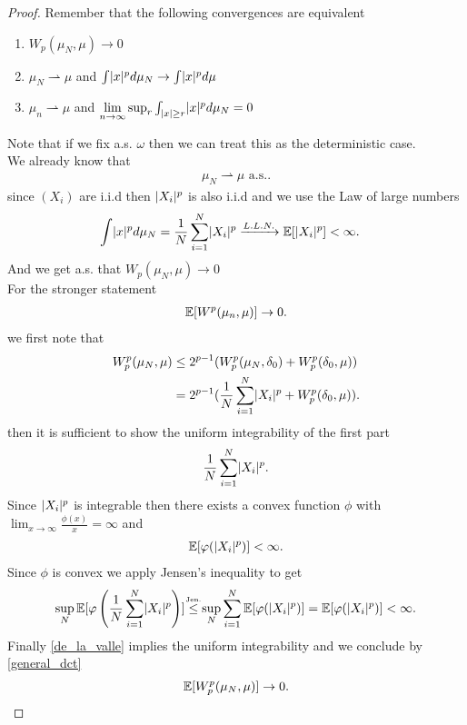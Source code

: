 \begin{proof}
 Remember that the following convergences are equivalent 
 \begin{enumerate}
   \item $W_p(\mu_N,\mu ) \to 0$
   \item $\mu_N \rightharpoonup \mu $ and $\int \lvert x\rvert^{p} d\mu_N \to \int \lvert x\rvert^{p} d\mu   $
   \item $\mu_n \rightharpoonup \mu $ and $\lim_{n\to \infty} \sup_r \int_{\abs{x} \ge r} \abs{x}^p d\mu_N = 0$
 \end{enumerate}
 Note that if we fix a.s. $\omega $ then we can treat this as the deterministic case. \\[1ex]
 We already know that 
 \begin{align*}
  \mu_N \rightharpoonup \mu \text{ a.s.}
 .\end{align*}
since $(X_i)$ are i.i.d then $\lvert X_i\rvert^{p} $ is also i.i.d  and we use the Law of large numbers
 \begin{align*}
   \int \lvert x\rvert^{p} d\mu_N   &= \frac{1}{N}\sum_{i=1}^{N} \lvert X_i\rvert^{p}  \xrightarrow{L.L.N.} \mathbb{E}[\lvert X_i\rvert^{p} ] < \infty
 .\end{align*} 
 And we get a.s. that $W_p(\mu_N,\mu ) \to  0$\\[1ex]
 For the stronger statement 
 \begin{align*}
   \mathbb{E}[W^{p}(\mu_n,\mu ) ] \to  0
 .\end{align*}
  we first note that  
 \begin{align*}
   W_p^{p}(\mu_N,\mu )  &\le  2^{p-1} (W^{p}_p(\mu_N,\delta_0)  + W_p^{p}(\delta_0,\mu )) \\
                        &= 2^{p-1} (\frac{1}{N} \sum_{i=1}^{N}   \lvert X_i\rvert^{p}  + W_p^{p}(\delta_0,\mu ))
 .\end{align*}
 then it is sufficient to show the uniform integrability of the first part 
 \begin{align*}
  \frac{1}{N}\sum_{i=1}^{N} \lvert X_i\rvert^{p}  
 .\end{align*}
 Since $\lvert X_i\rvert^{p} $ is integrable then there exists a convex function  $\phi $ with $\lim_{x \to \infty} \frac{\phi(x)}{x} = \infty$ and 
 \begin{align*}
   \mathbb{E}[\varphi(\lvert X_i\rvert^{p} )] < \infty
 .\end{align*}
 Since $\phi $ is convex we apply Jensen's inequality to get 
 \begin{align*}
   \sup_N \E[\phi \left(\frac{1}{N}\sum_{i=1}^{N} \abs{X_i}^{p}\right)  ]  \myS{Jen.}{\le } \sup_N \sum_{i=1}^{N}\E[\phi (\abs{X_i}^{p} )] =  \E[\phi(\abs{X_i}^{p} )] < \infty
 .\end{align*}
 Finally \autoref{de_la_valle}  implies the uniform integrability and we conclude by \autoref{general_dct}
 \begin{align*}
   \mathbb{E}[W_p^{p}(\mu_N,\mu ) ]\to 0
 .\end{align*}
\end{proof}
